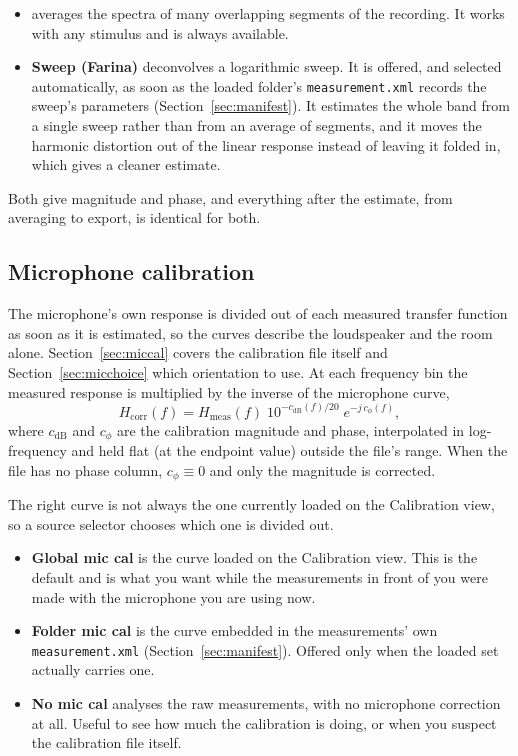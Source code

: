 \begin{itemize}[nosep]
  \item \textbf{} averages the spectra of many overlapping segments of the recording. It works with any stimulus and is always available.
  \item \textbf{Sweep (Farina)} deconvolves a logarithmic sweep. It is offered, and selected automatically, as soon as the loaded folder's \texttt{measurement.xml} records the sweep's parameters (Section~\ref{sec:manifest}). It estimates the whole band from a single sweep rather than from an average of segments, and it moves the harmonic distortion out of the linear response instead of leaving it folded in, which gives a cleaner estimate.
\end{itemize}

\noindent Both give magnitude and phase, and everything after the estimate, from averaging to export, is identical for both.

\subsection{Microphone calibration}\label{sec:micsource}
The microphone's own response is divided out of each measured transfer function as soon as it is estimated, so the curves describe the loudspeaker and the room alone. Section~\ref{sec:miccal} covers the calibration file itself and Section~\ref{sec:micchoice} which orientation to use. At each frequency bin the measured response is multiplied by the inverse of the microphone curve,
\begin{equation}
  H_{\text{corr}}(f) = H_{\text{meas}}(f)\;
      10^{-c_{\mathrm{dB}}(f)/20}\; e^{-j\,c_{\phi}(f)},
  \label{eq:miccal}
\end{equation}
where $c_{\mathrm{dB}}$ and $c_{\phi}$ are the calibration magnitude and phase, interpolated in log-frequency and held flat (at the endpoint value) outside the file's range. When the file has no phase column, $c_{\phi}\equiv 0$ and only the magnitude is corrected.

The right curve is not always the one currently loaded on the Calibration view, so a source selector chooses which one is divided out.

\begin{itemize}[nosep]
  \item \textbf{Global mic cal} is the curve loaded on the Calibration view. This is the default and is what you want while the measurements in front of you were made with the microphone you are using now.
  \item \textbf{Folder mic cal} is the curve embedded in the measurements' own \texttt{measurement.xml} (Section~\ref{sec:manifest}). Offered only when the loaded set actually carries one.
  \item \textbf{No mic cal} analyses the raw measurements, with no microphone correction at all. Useful to see how much the calibration is doing, or when you suspect the calibration file itself.
\end{itemize}

